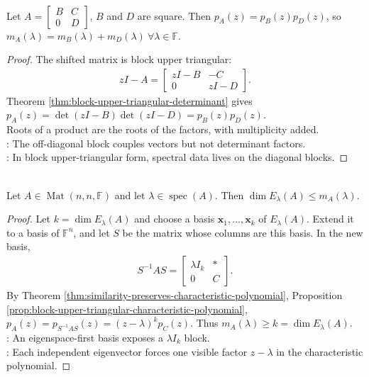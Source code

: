 \begin{proposition} \label{prop:block-upper-triangular-characteristic-polynomial} \\
Let $A=
\begin{bmatrix}
B & C\\
0 & D
\end{bmatrix}$, $B$ and $D$ are square. Then $p_A(z)=p_B(z)p_D(z)$, so $m_A(\lambda)=m_B(\lambda)+m_D(\lambda) \ \forall\lambda\in\mathbb{F}$.
\begin{proof}
The shifted matrix is block upper triangular:
\begin{align}
zI-A=
\begin{bmatrix}
zI-B & -C\\
0 & zI-D
\end{bmatrix}.
\nonumber
\end{align}
Theorem \ref{thm:block-upper-triangular-determinant} gives $p_A(z)=\det(zI-B)\det(zI-D)=p_B(z)p_D(z)$.\\
Roots of a product are the roots of the factors, with multiplicity added.\\
: The off-diagonal block couples vectors but not determinant factors.\\
: In block upper-triangular form, spectral data lives on the diagonal blocks.
\end{proof}
\end{proposition}

\begin{theorem} \label{thm:geometric-multiplicity-bounded-by-algebraic-multiplicity} \\
Let $A\in\operatorname{Mat}(n,n,\mathbb{F})$ and let $\lambda\in\operatorname{spec}(A)$. Then $\dim E_{\lambda}(A)\leq m_A(\lambda)$.
\begin{proof}
Let $k=\dim E_{\lambda}(A)$ and choose a basis $\mathbf{x}_1,\ldots,\mathbf{x}_k$ of $E_{\lambda}(A)$. Extend it to a basis of $\mathbb{F}^n$, and let $S$ be the matrix whose columns are this basis. In the new basis,
\begin{align}
S^{-1}AS=
\begin{bmatrix}
\lambda I_k & *\\
0 & C
\end{bmatrix}.
\nonumber
\end{align}
By Theorem \ref{thm:similarity-preserves-characteristic-polynomial}, Proposition \ref{prop:block-upper-triangular-characteristic-polynomial}, $p_A(z)=p_{S^{-1}AS}(z)=(z-\lambda)^kp_C(z)$. Thus $m_A(\lambda)\geq k=\dim E_{\lambda}(A)$.\\
: An eigenspace-first basis exposes a $\lambda I_k$ block.\\
: Each independent eigenvector forces one visible factor $z-\lambda$ in the characteristic polynomial.
\end{proof}
\end{theorem}

